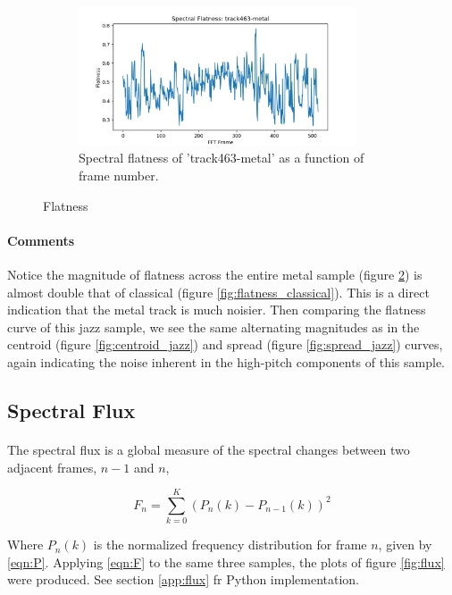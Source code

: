 \documentclass[11pt,a4paper]{article}
\begin{document}
\begin{figure}[tb]\ContinuedFloat
	\begin{subfigure}[t]{\hsize}
		\centering
		\includegraphics[width=0.9\textwidth]{flatness_track463-metal}
		\caption{Spectral flatness of 'track463-metal' as a function of frame number.}
		\label{fig:flatness_metal}
	\end{subfigure}
	\caption{Flatness}
\end{figure}

\paragraph{Comments} Notice the magnitude of flatness across the entire metal sample (figure \ref{fig:flatness_metal}) is almost double that of classical (figure \ref{fig:flatness_classical}). This is a direct indication that the metal track is much noisier. Then comparing the flatness curve of this jazz sample, we see the same alternating magnitudes as in the centroid (figure \ref{fig:centroid_jazz}) and spread (figure \ref{fig:spread_jazz}) curves, again indicating the noise inherent in the high-pitch components of this sample.

\subsection{Spectral Flux}
\paragraph*{} The spectral flux is a global measure of the spectral changes between two adjacent frames, $n-1$ and $n$,

\begin{equation} \label{eqn:F}
F_n = \sum_{k=0}^{K} (P_n(k)-P_{n-1}(k))^2
\end{equation}

Where $P_n(k)$ is the normalized frequency distribution for frame $n$, given by \ref{eqn:P}. Applying \ref{eqn:F} to the same three samples, the plots of figure \ref{fig:flux} were produced. See section \ref{app:flux} fr Python implementation.
\end{document}
